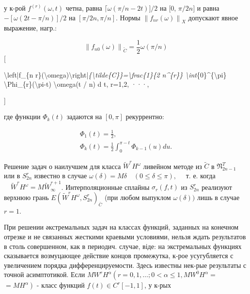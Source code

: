 \documentclass[10pt]{article}
\begin{document}
у к-рой $f^{(r)}(\omega, t)$ четна, равна $\lceil\omega(\pi / n-2 t)] / 2$ на $[0$, $\pi / 2 n]$ и равна $-[\omega(2 t-\pi / n)] / 2$ на $[\pi / 2 n, \pi / n]$. Нормы $\left\|f_{n r}(\omega)\right\|_{X}$ допускают явное выражение, нагр.:



\[

\left\|f_{n 0}(\omega)\right\|_{\tilde{C}}=\frac{1}{2} \omega(\pi / n)

\][



\textbackslash left|f\_\{n r\}(\textbackslash omega)\textbackslash right|\textit{\{\textbackslash tilde\{C\}\}=\textbackslash frac\{1\}\{2 n\^{}\{r\}\} \textbackslash int}\{0\}\^{}\{\textbackslash pi\} \textbackslash Phi\_\{r\}(\textbackslash pi-t) \textbackslash omega(t / n) d t, r=1,2, ···,

]



где функции $\Phi_{k}(t)$ задаются на $[0, \pi]$ рекуррентно:



\[

\begin{gathered}

\Phi_{1}(t)=\frac{1}{2}, \\

\Phi_{k}(t)=\frac{1}{2} \int_{0}^{\pi-t} \Phi_{k-1}(u) d u .

\end{gathered}

\]



Решение задач о наилучшем для класса $\tilde{W}^{r} H^{\omega}$ ливейном методе из $\tilde{C}$ в $\mathfrak{N}_{2 n-1}^{T}$ или в $S_{2 n}^{r}$ известно в случае $\omega(\delta)=M \delta \quad(0 \leqslant \delta \leqslant \pi), \quad$ т. е. когда $\quad \tilde{W}^{r} H^{\omega}=M \tilde{W}_{\infty}^{r+1}$. Интерполяционные сплайны $\sigma_{r}(f, t)$ из $S_{2 n}^{r}$ реализуют верхнюю грань $E\left(\tilde{W}^{r} H^{\omega}, S_{2 n}^{r}\right)_{\bar{C}}$ (при любом выпуклом $\omega(\delta))$ лишь в случае $r=1$.



При решении әкстремальных задач на классах функций, заданных на конечном отрезке и не связанных жесткими краевыми условиями, нельзя ждать результатов в столь совершенном, как в периодич. случае, віде: на экстремальных функциях сказывается возмуцающее действие концов промежутка, к-рое усугубляется с увеличением порядка дифференцируемости. Здесь известны нек-рые результаты с точной асимптотикой. Если $M W^{r} H^{\alpha}\left(r=0,1, \ldots ; 0<\alpha \leqslant 1, M W^{0} H^{\alpha}=\right.$ $\left.=M H^{\alpha}\right)$ - класс функций $f(t) \in C^{r}[-1,1]$, у к-рых
\end{document}
